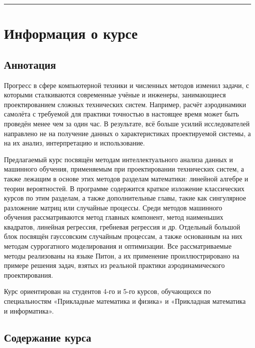 \documentclass[11pt,a4paper]{article}
\begin{document}
    \begin{center}\rule{0.5\linewidth}{0.5pt}\end{center}

    \hypertarget{ux438ux43dux444ux43eux440ux43cux430ux446ux438ux44f-ux43e-ux43aux443ux440ux441ux435}{%
\section{Информация о
курсе}\label{ux438ux43dux444ux43eux440ux43cux430ux446ux438ux44f-ux43e-ux43aux443ux440ux441ux435}}

\hypertarget{ux430ux43dux43dux43eux442ux430ux446ux438ux44f}{%
\subsection{Аннотация}\label{ux430ux43dux43dux43eux442ux430ux446ux438ux44f}}

Прогресс в сфере компьютерной техники и численных методов изменил
задачи, с которыми сталкиваются современные учёные и инженеры,
занимающиеся проектированием сложных технических систем. Например,
расчёт аэродинамики самолёта с требуемой для практики точностью в
настоящее время может быть проведён менее чем за один час. В результате,
всё больше усилий исследователей направлено не на получение данных о
характеристиках проектируемой системы, а на их анализ, интерпретацию и
использование.

Предлагаемый курс посвящён методам интеллектуального анализа данных и
машинного обучения, применяемым при проектировании технических систем, а
также лежащим в основе этих методов разделам математики: линейной
алгебре и теории вероятностей. В программе содержится краткое изложение
классических курсов по этим разделам, а также дополнительные главы,
такие как сингулярное разложение матриц или случайные процессы. Среди
методов машинного обучения рассматриваются метод главных компонент,
метод наименьших квадратов, линейная регрессия, гребневая регрессия и
др. Отдельный большой блок посвящён гауссовским случайным процессам, а
также основанным на них методам суррогатного моделирования и
оптимизации. Все рассматриваемые методы реализованы на языке Питон, а их
применение проиллюстрировано на примере решения задач, взятых из
реальной практики аэродинамического проектирования.

Курс ориентирован на студентов 4-го и 5-го курсов, обучающихся по
специальностям «Прикладные математика и физика» и «Прикладная математика
и информатика».

    \hypertarget{ux441ux43eux434ux435ux440ux436ux430ux43dux438ux435-ux43aux443ux440ux441ux430}{%
\subsection{Содержание
курса}\label{ux441ux43eux434ux435ux440ux436ux430ux43dux438ux435-ux43aux443ux440ux441ux430}}
\end{document}
